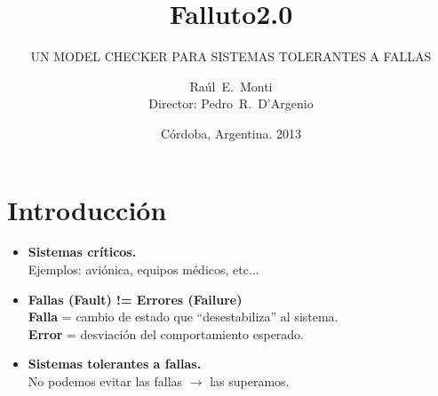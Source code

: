 \documentclass[serif]{beamer}
\title[\Falluto20] %
{Falluto2.0}
\subtitle{ UN MODEL CHECKER PARA SISTEMAS TOLERANTES A FALLAS}
\author[Monti] %
{Raúl~E.~Monti\\\hspace{73pt}Director: Pedro~R.~D'Argenio}
\institute[FaMAF - UNC] %
{
Facultad de Matem\'atica, Astronom\'ia y F\'isica, Universidad Nacional de 
Córdoba
}
\date[4-2-2013] %
{Córdoba, Argentina. 2013}
\begin{document}
\frame{\titlepage}


\section[Intro]{Introducción}


\begin{frame}
\begin{itemize}\itemsep15pt
\item {\Large \bfseries Sistemas críticos.}\\[5pt]
\hspace{0.5cm}Ejemplos: aviónica, equipos médicos, etc...
\item {\Large \bfseries Fallas (Fault) != Errores (Failure)}\\[5pt]
\hspace{0.5cm}\textbf{Falla} = cambio de estado que ``desestabiliza'' al sistema.\\[5pt]
\hspace{0.5cm}\textbf{Error} = desviación del comportamiento esperado.
\item {\Large \bfseries Sistemas tolerantes a fallas.}\\[5pt]
\hspace{0.5cm}No podemos evitar las fallas $\longrightarrow$ las superamos.
\end{itemize}
\end{frame}
\end{document}
